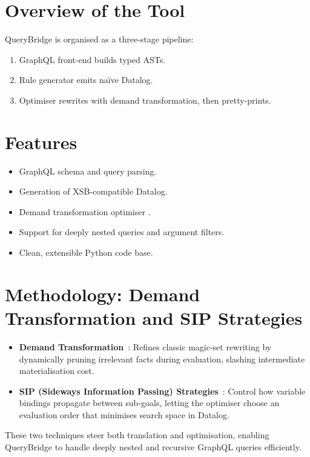 \documentclass[11pt]{article}
\begin{document}
\section{Overview of the Tool}
QueryBridge is organised as a three-stage pipeline:
\begin{enumerate}[label=\arabic*.]
  \item GraphQL front-end builds typed ASTs.
  \item Rule generator emits naïve Datalog.
  \item Optimiser rewrites with demand transformation, then pretty-prints.
\end{enumerate}

\section{Features}
\begin{itemize}[leftmargin=1.5em]
  \item GraphQL schema and query parsing.
  \item Generation of XSB-compatible Datalog.
  \item Demand transformation optimiser \cite{DemandTransform}.
  \item Support for deeply nested queries and argument filters.
  \item Clean, extensible Python code base.
\end{itemize}

\section{Methodology: Demand Transformation and SIP Strategies}
\begin{itemize}[leftmargin=1.5em]
  \item \textbf{Demand Transformation}~\cite{DemandTransform}:  
        Refines classic magic-set rewriting by dynamically pruning irrelevant facts during evaluation, slashing intermediate materialisation cost.
  \item \textbf{SIP (Sideways Information Passing) Strategies}~\cite{SIPSlides}:  
        Control how variable bindings propagate between sub-goals, letting the optimiser choose an evaluation order that minimises search space in Datalog.
\end{itemize}
These two techniques steer both translation and optimisation, enabling QueryBridge to handle deeply nested and recursive GraphQL queries efficiently.
\end{document}
